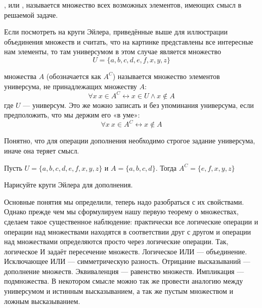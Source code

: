 \begin{definition}
, или , называется множество всех возможных элементов, имеющих смысл в решаемой задаче.
\end{definition}

\begin{example}
Если посмотреть на круги Эйлера, приведённые выше для иллюстрации объединения множеств и считать, что на картинке представлены все интересные нам элементы, то там универсумом в этом случае является множество
$$U = \{a, b, c, d, e, f, x, y, z\}$$
\end{example}

\begin{definition}
 множества $A$ (обозначается как $A^C$) называется множество элементов универсума, не принадлежащих множеству $A$:
$$\forall x\ x\in A^C \leftrightarrow x\in U \wedge x \not \in A$$
где $U$ — универсум. Это же можно записать и без упоминания универсума, если предположить, что мы держим его «в уме»:
$$\forall x\ x\in A^C \leftrightarrow x\not \in A$$
\end{definition}

Понятно, что для операции дополнения необходимо строгое задание универсума, иначе она теряет смысл.

\begin{example}
Пусть $U = \{a, b, c, d, e, f, x, y, z\}$ и $A = \{a, b, c, d\}$. Тогда $A^C = \{e, f, x, y, z\}$
\end{example}

\begin{exercise}
Нарисуйте круги Эйлера для дополнения.
\end{exercise}

Основные понятия мы определили, теперь надо разобраться с их свойствами. Однако прежде чем мы сформулируем нашу первую теорему о множествах, сделаем такое существенное наблюдение: практически все логические операции и операции над множествами находятся в соответствии друг с другом и операции над множествами определяются просто через логические операции. Так, логическое И задаёт пересечение множеств. Логическое ИЛИ — объединение. Исключающее ИЛИ — симметрическую разность. Отрицание высказываний — дополнение множеств. Эквиваленция — равенство множеств. Импликация — подмножества. В некотором смысле можно так же провести аналогию между универсумом и истинным высказыванием, а так же пустым множеством и ложным высказыванием.

